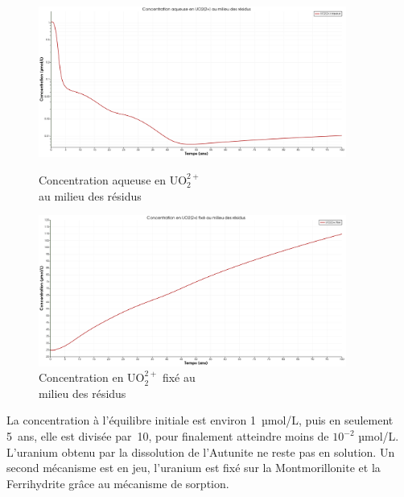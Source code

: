 \documentclass{article}
\begin{document}
\begin{figure}[H]
    \centering
    \begin{minipage}{0.5\textwidth}
        \centering
        \includegraphics[width=0.9\textwidth]{III_B_2_3.png} 
        \caption{Concentration aqueuse en UO$_2^{2+}$ \\ au milieu des résidus}
        \label{fig:UO2_residus_sable_base}
    \end{minipage}\hfill
    \begin{minipage}{0.5\textwidth}
        \centering
        \includegraphics[width=0.9\textwidth]{III_B_2_4.png} 
        \caption{Concentration en UO$_2^{2+}$ fixé au \\milieu des résidus}
        \label{fig:UO2_fixe_residus_sable_base}
    \end{minipage}
\end{figure}

La concentration à l’équilibre initiale est environ 1~µmol/L, puis en seulement 5~ans, elle est divisée par~10, pour finalement atteindre moins de $10^{-2}$ µmol/L. L’uranium obtenu par la dissolution de l'Autunite ne reste pas en solution. Un second mécanisme est en jeu, l'uranium est fixé sur la Montmorillonite et la Ferrihydrite grâce au mécanisme de sorption.
\end{document}
